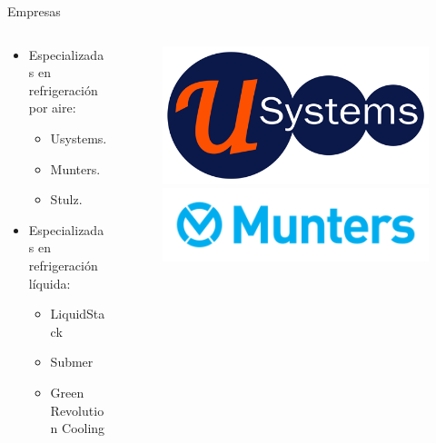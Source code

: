 \documentclass[aspectratio=169, compress]{beamer}
\begin{document}
\begin{frame}{Empresas}
    \begin{columns}
        \begin{column}{0.5\textwidth}
            \begin{itemize}
                \item Especializadas en refrigeración por aire:
                \begin{itemize}
                    \item Usystems.
                    \item Munters.
                    \item Stulz.
                \end{itemize}

                \item Especializadas en refrigeración líquida:
                \begin{itemize}
                    \item LiquidStack
                    \item Submer
                    \item Green Revolution Cooling
                \end{itemize}
            \end{itemize}
        
            
        \end{column}
        \begin{column}{0.5\textwidth}
            \begin{figure}
                \begin{center}
                    \includegraphics[scale=0.15]{./figures/usystems}
                    \includegraphics[scale=0.2]{./figures/munters}


\end{center}
\end{figure}
\end{column}
\end{columns}
\end{frame}
\end{document}

